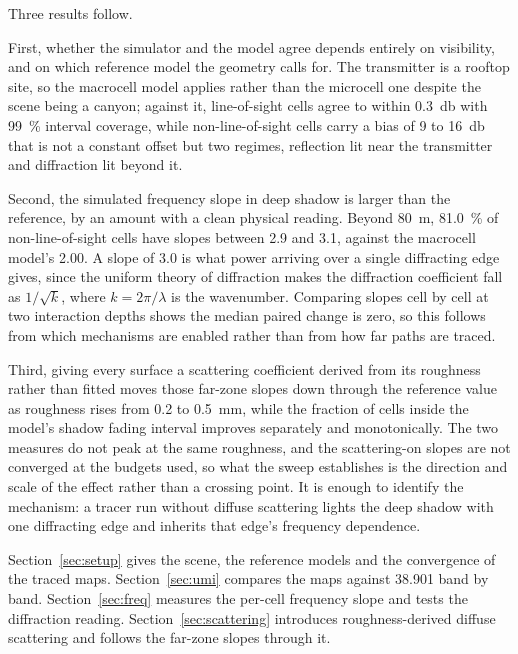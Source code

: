 \documentclass[conference]{IEEEtran}
\begin{document}
Three results follow.

First, whether the simulator and the model agree depends entirely on
visibility, and on which reference model the geometry calls for. The
transmitter is a rooftop site, so the macrocell model applies rather than the
microcell one despite the scene being a canyon; against it, line-of-sight
cells agree to within \SI{0.3}{\decibel} with \SI{99}{\percent} interval
coverage, while non-line-of-sight cells carry a bias of \SI{9}{} to
\SI{16}{\decibel} that is not a constant offset but two regimes, reflection
lit near the transmitter and diffraction lit beyond it.

Second, the simulated frequency slope in deep shadow is larger than the
reference, by an amount with a clean physical reading. Beyond \SI{80}{\metre},
\SI{81.0}{\percent} of non-line-of-sight cells have slopes between \num{2.9}
and \num{3.1}, against the macrocell model's \num{2.00}. A slope of \num{3.0}
is what power arriving over a single diffracting edge gives, since the uniform
theory of diffraction \cite{kouyoumjian1974utd} makes the diffraction
coefficient fall as $1/\sqrt{k}$, where $k = 2\pi/\lambda$ is the
wavenumber. Comparing slopes cell by cell at two
interaction depths shows the median paired change is zero, so this follows
from which mechanisms are enabled rather than from how far paths are traced.

Third, giving every surface a scattering coefficient derived from its
roughness rather than fitted moves those far-zone slopes down through the
reference value as roughness rises from \SI{0.2}{} to
\SI{0.5}{\milli\metre}, while the fraction of cells inside the model's
shadow fading interval improves separately and monotonically. The two measures
do not peak at the same roughness, and the scattering-on slopes are not
converged at the budgets used, so what the sweep establishes is the direction
and scale of the effect rather than a crossing point. It is enough to identify
the mechanism: a tracer run without diffuse scattering lights the deep shadow
with one diffracting edge and inherits that edge's frequency dependence.

Section~\ref{sec:setup} gives the scene, the reference models and the
convergence of the traced maps. Section~\ref{sec:umi} compares the maps
against 38.901 band by band. Section~\ref{sec:freq} measures the per-cell
frequency slope and tests the diffraction reading. Section~\ref{sec:scattering}
introduces roughness-derived diffuse scattering and follows the far-zone
slopes through it.
\end{document}
